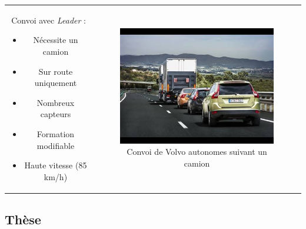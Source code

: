 \documentclass{beamer}
\begin{document}
\begin{frame}
  \begin{tabular}{c c}
    \begin{minipage}{0.5\linewidth}
      Convoi avec \textit{Leader} :
      \begin{itemize}
      \item Nécessite un camion
      \item Sur route uniquement
      \item Nombreux capteurs
      \item Formation modifiable
      \item Haute vitesse (85 km/h)
      \end{itemize}
    \end{minipage}
    &
    \begin{minipage}{0.5\linewidth}
      \begin{figure}
        \includegraphics[width=1.0\linewidth]{images/ConvoiVolvo.jpg}
        \caption{Convoi de Volvo autonomes suivant un camion}
      \end{figure}
    \end{minipage}
  \end{tabular}
\end{frame}

\subsection*{Thèse}
\end{document}
